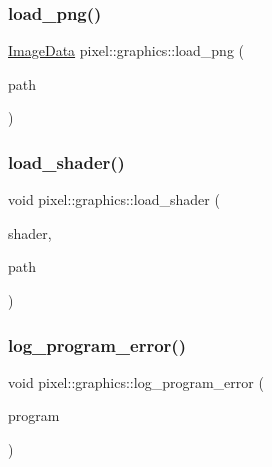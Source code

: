 \mbox{\label{namespacepixel_1_1graphics_a719505e54207dc3fb06242ed6587081e}} 
\subsubsection{\texorpdfstring{load\+\_\+png()}{load\_png()}}
{\footnotesize\ttfamily \hyperlink{structpixel_1_1graphics_1_1_image_data}{Image\+Data} pixel\+::graphics\+::load\+\_\+png (\begin{DoxyParamCaption}\item[{const std\+::string \&}]{path }\end{DoxyParamCaption})}

\mbox{\label{namespacepixel_1_1graphics_af428e812eb483510b5935cf0fdaa930e}} 
\subsubsection{\texorpdfstring{load\+\_\+shader()}{load\_shader()}}
{\footnotesize\ttfamily void pixel\+::graphics\+::load\+\_\+shader (\begin{DoxyParamCaption}\item[{G\+Luint}]{shader,  }\item[{const char $\ast$}]{path }\end{DoxyParamCaption})}

\mbox{\label{namespacepixel_1_1graphics_ae25919fb3b3b437e1f71b1a69d6938d5}} 
\subsubsection{\texorpdfstring{log\+\_\+program\+\_\+error()}{log\_program\_error()}}
{\footnotesize\ttfamily void pixel\+::graphics\+::log\+\_\+program\+\_\+error (\begin{DoxyParamCaption}\item[{G\+Luint}]{program }\end{DoxyParamCaption})}

